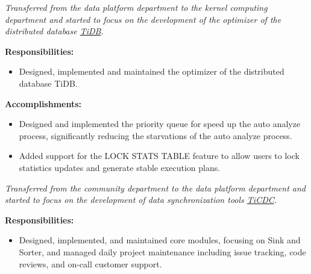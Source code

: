 \documentclass{software_engineer_rustin_liu}
\newcommand{\en}[1]{#1}
\newcommand{\zh}[1]{}
\begin{document}
\en{}
\zh{\datedsubsection{\textbf{\href{https://pingcap.com/zh/}{PingCAP Inc. - 数据库 - 数据库内核研发（Golang/Rust）}}}{2023/08 -- 至今}}
\en{\textsl{Transferred from the data platform department to the kernel computing department and started to focus on the development of the optimizer of the distributed database {\href{https://github.com/pingcap/tidb}{TiDB}}.}}
\zh{\textsl{从数据平台部门转组到计算内核部门，开始专注于分布式数据库 {\href{https://github.com/pingcap/tidb}{TiDB} 优化器的研发。}}}

\en{\textbf{Responsibilities:}}
\zh{\textbf{职责：}}
\begin{itemize}
      \item \en{Designed, implemented and maintained the optimizer of the distributed database TiDB.}
      \zh{设计、实现和维护分布式数据库 TiDB 的优化器。}
\end{itemize}

\en{\textbf{Accomplishments:}}
\zh{\textbf{产出：}}
\begin{itemize}
      \item \en{Designed and implemented the priority queue for speed up the auto analyze process, significantly reducing the starvations of the auto analyze process.}
      \zh{设计并实现了优先级队列，加速了自动分析过程，极大的减少了自动分析过程的饥饿现象。}
      \item \en{Added support for the LOCK STATS TABLE feature to allow users to lock statistics updates and generate stable execution plans.}
      \zh{添加 LOCK STATS TABLE 功能，方便用户锁定统计信息的更新，生成稳定的执行计划。}
\end{itemize}

\en{}
\zh{\datedsubsection{\textbf{\href{https://pingcap.com/zh/}{PingCAP Inc. - 数据库 - 数据库工具研发（Golang/Rust）}}}{2021/07 -- 2023/07}}
\en{\textsl{Transferred from the community department to the data platform department and started to focus on the development of data synchronization tools {\href{https://github.com/pingcap/tiflow}{TiCDC}}.}}
\zh{\textsl{从社区部门转组到数据平台部门，开始专注于数据同步工具 {\href{https://github.com/pingcap/tiflow}{TiCDC} 的研发。}}}

\en{\textbf{Responsibilities:}}
\zh{\textbf{职责：}}
\begin{itemize}
      \item \en{Designed, implemented, and maintained core modules, focusing on Sink and Sorter, and managed daily project maintenance including issue tracking, code reviews, and on-call customer support.}
            \zh{设计、实现和维护核心模块，专注于 Sink 和 Sorter，管理项目日常维护，包括 issue 追踪、代码审阅和 on-call 客户支持。}
\end{itemize}
\end{document}
